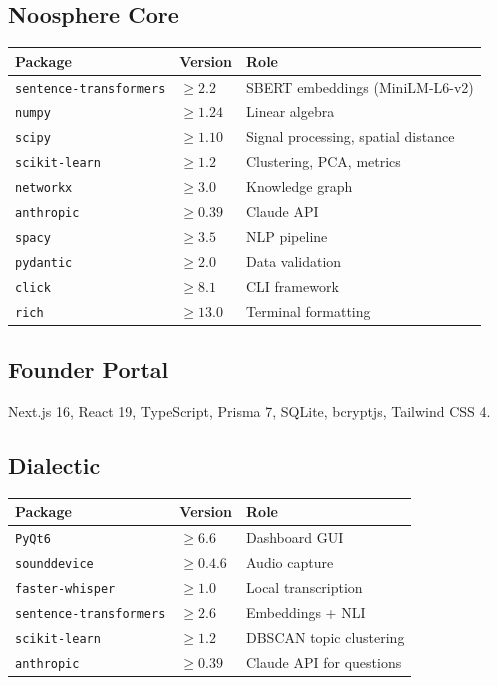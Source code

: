 \documentclass[11pt,letterpaper]{article}
\begin{document}
\subsection{Noosphere Core}

\begin{center}
\begin{tabular}{lll}
\toprule
\textbf{Package} & \textbf{Version} & \textbf{Role} \\
\midrule
\texttt{sentence-transformers} & $\geq 2.2$ & SBERT embeddings (MiniLM-L6-v2) \\
\texttt{numpy} & $\geq 1.24$ & Linear algebra \\
\texttt{scipy} & $\geq 1.10$ & Signal processing, spatial distance \\
\texttt{scikit-learn} & $\geq 1.2$ & Clustering, PCA, metrics \\
\texttt{networkx} & $\geq 3.0$ & Knowledge graph \\
\texttt{anthropic} & $\geq 0.39$ & Claude API \\
\texttt{spacy} & $\geq 3.5$ & NLP pipeline \\
\texttt{pydantic} & $\geq 2.0$ & Data validation \\
\texttt{click} & $\geq 8.1$ & CLI framework \\
\texttt{rich} & $\geq 13.0$ & Terminal formatting \\
\bottomrule
\end{tabular}
\end{center}

\subsection{Founder Portal}

Next.js 16, React 19, TypeScript, Prisma 7, SQLite, bcryptjs, Tailwind CSS 4.

\subsection{Dialectic}

\begin{center}
\begin{tabular}{lll}
\toprule
\textbf{Package} & \textbf{Version} & \textbf{Role} \\
\midrule
\texttt{PyQt6} & $\geq 6.6$ & Dashboard GUI \\
\texttt{sounddevice} & $\geq 0.4.6$ & Audio capture \\
\texttt{faster-whisper} & $\geq 1.0$ & Local transcription \\
\texttt{sentence-transformers} & $\geq 2.6$ & Embeddings + NLI \\
\texttt{scikit-learn} & $\geq 1.2$ & DBSCAN topic clustering \\
\texttt{anthropic} & $\geq 0.39$ & Claude API for questions \\
\bottomrule
\end{tabular}
\end{center}
\end{document}

